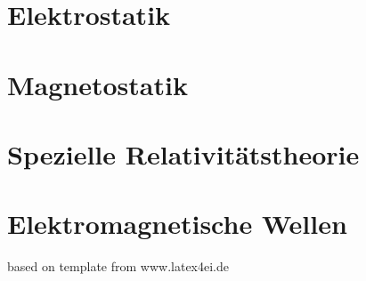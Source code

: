 \documentclass[german]{latex4ei/latex4ei_sheet}
\begin{document}
\section{Elektrostatik}
\section{Magnetostatik}
\section{Spezielle Relativitätstheorie}
\section{Elektromagnetische Wellen}
\tiny{based on template from www.latex4ei.de}
\end{document}
